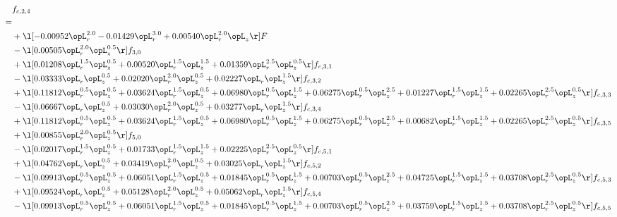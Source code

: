 \begin{alignat}{2} 
\label{eq:f_24_2} 
& f_{c,2,4} \nonumber \\ 
 = \\ 
& + \l[  -0.00952 \opL_r^{2.0}   -0.01429 \opL_r^{3.0} +  0.00540 \opL_r^{2.0} \opL_z  \r] F \nonumber \\ 
& - \l[  0.00505 \opL_r^{2.0} \opL_z^{0.5}  \r] f_{3,0} \nonumber \\ 
& + \l[  0.01208 \opL_r^{1.5} \opL_z^{0.5} +  0.00520 \opL_r^{1.5} \opL_z^{1.5} +  0.01359 \opL_r^{2.5} \opL_z^{0.5}  \r] f_{c,3,1} \nonumber \\ 
& - \l[  0.03333 \opL_r \opL_z^{0.5} +  0.02020 \opL_r^{2.0} \opL_z^{0.5} +  0.02227 \opL_r \opL_z^{1.5}  \r] f_{c,3,2} \nonumber \\ 
& + \l[  0.11812 \opL_r^{0.5} \opL_z^{0.5} +  0.03624 \opL_r^{1.5} \opL_z^{0.5} +  0.06980 \opL_r^{0.5} \opL_z^{1.5} +  0.06275 \opL_r^{0.5} \opL_z^{2.5} +  0.01227 \opL_r^{1.5} \opL_z^{1.5} +  0.02265 \opL_r^{2.5} \opL_z^{0.5}  \r] f_{c,3,3} \nonumber \\ 
& - \l[  0.06667 \opL_r \opL_z^{0.5} +  0.03030 \opL_r^{2.0} \opL_z^{0.5} +  0.03277 \opL_r \opL_z^{1.5}  \r] f_{c,3,4} \nonumber \\ 
& + \l[  0.11812 \opL_r^{0.5} \opL_z^{0.5} +  0.03624 \opL_r^{1.5} \opL_z^{0.5} +  0.06980 \opL_r^{0.5} \opL_z^{1.5} +  0.06275 \opL_r^{0.5} \opL_z^{2.5} +  0.00682 \opL_r^{1.5} \opL_z^{1.5} +  0.02265 \opL_r^{2.5} \opL_z^{0.5}  \r] f_{c,3,5} \nonumber \\ 
& + \l[  0.00855 \opL_r^{2.0} \opL_z^{0.5}  \r] f_{5,0} \nonumber \\ 
& - \l[  0.02017 \opL_r^{1.5} \opL_z^{0.5} +  0.01733 \opL_r^{1.5} \opL_z^{1.5} +  0.02225 \opL_r^{2.5} \opL_z^{0.5}  \r] f_{c,5,1} \nonumber \\ 
& + \l[  0.04762 \opL_r \opL_z^{0.5} +  0.03419 \opL_r^{2.0} \opL_z^{0.5} +  0.03025 \opL_r \opL_z^{1.5}  \r] f_{c,5,2} \nonumber \\ 
& - \l[  0.09913 \opL_r^{0.5} \opL_z^{0.5} +  0.06051 \opL_r^{1.5} \opL_z^{0.5} +  0.01845 \opL_r^{0.5} \opL_z^{1.5} +  0.00703 \opL_r^{0.5} \opL_z^{2.5} +  0.04725 \opL_r^{1.5} \opL_z^{1.5} +  0.03708 \opL_r^{2.5} \opL_z^{0.5}  \r] f_{c,5,3} \nonumber \\ 
& + \l[  0.09524 \opL_r \opL_z^{0.5} +  0.05128 \opL_r^{2.0} \opL_z^{0.5} +  0.05062 \opL_r \opL_z^{1.5}  \r] f_{c,5,4} \nonumber \\ 
& - \l[  0.09913 \opL_r^{0.5} \opL_z^{0.5} +  0.06051 \opL_r^{1.5} \opL_z^{0.5} +  0.01845 \opL_r^{0.5} \opL_z^{1.5} +  0.00703 \opL_r^{0.5} \opL_z^{2.5} +  0.03759 \opL_r^{1.5} \opL_z^{1.5} +  0.03708 \opL_r^{2.5} \opL_z^{0.5}  \r] f_{c,5,5} \nonumber \\ 

\end{alignat}
